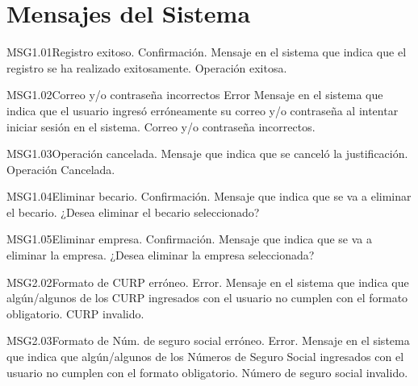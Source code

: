 \chapter{Mensajes del Sistema}
\label{cap:mensajes}



\begin{Message}{MSG1.01}{Registro exitoso.}
	\MSGitem[Tipo:] Confirmación.	
	\MSGitem[Objetivo:] Mensaje en el sistema que indica que el registro se ha realizado exitosamente.
	\MSGitem[Redacción:] Operación exitosa.
\end{Message}
\begin{Message}{MSG1.02}{Correo y/o contraseña incorrectos}
	\MSGitem[Tipo:] Error
	\MSGitem[Objetivo:] Mensaje en el sistema que indica que el usuario ingresó erróneamente su correo y/o contraseña al intentar iniciar sesión en el sistema.
	\MSGitem[Redacción:] Correo y/o contraseña incorrectos.
\end{Message}

\begin{Message}{MSG1.03}{Operación cancelada.}
	\MSGitem[Tipo:] 
	\MSGitem[Objetivo:] Mensaje que indica que se canceló la justificación.
	\MSGitem[Redacción:] Operación Cancelada.
\end{Message}
\begin{Message}{MSG1.04}{Eliminar becario.}
	\MSGitem[Tipo:] Confirmación.
	\MSGitem[Objetivo:] Mensaje que indica que se va a eliminar el becario.
	\MSGitem[Redacción:] ¿Desea eliminar el becario seleccionado?
\end{Message}
\begin{Message}{MSG1.05}{Eliminar empresa.}
	\MSGitem[Tipo:] Confirmación.
	\MSGitem[Objetivo:] Mensaje que indica que se va a eliminar la empresa.
	\MSGitem[Redacción:] ¿Desea eliminar la empresa seleccionada?
\end{Message}

\begin{Message}{MSG2.02}{Formato de CURP erróneo.}
	\MSGitem[Tipo:] Error.	
	\MSGitem[Objetivo:] Mensaje en el sistema que indica que algún/algunos de los CURP ingresados con el usuario no cumplen con el formato obligatorio.
	\MSGitem[Redacción:] CURP invalido.
\end{Message}

\begin{Message}{MSG2.03}{Formato de Núm. de seguro social erróneo.}
	\MSGitem[Tipo:] Error.	
	\MSGitem[Objetivo:] Mensaje en el sistema que indica que algún/algunos de los Números de Seguro Social ingresados con el usuario no cumplen con el formato obligatorio.
	\MSGitem[Redacción:] Número de seguro social invalido.
\end{Message}

